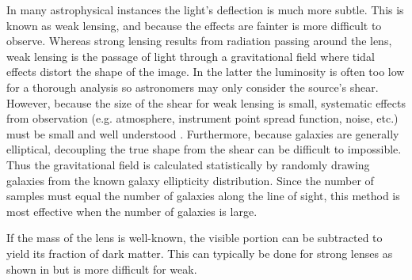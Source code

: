 In many astrophysical instances the light's deflection is much more subtle.  This is known as weak
lensing, and because the effects are fainter is more difficult to observe.  Whereas strong lensing results from radiation passing around
the lens, weak lensing is the passage of light through a gravitational field where tidal effects distort the shape of the image.  In the
latter the luminosity is often too low for a thorough analysis so
astronomers may only consider the source's shear.  However, because the size of the shear for weak lensing is small, systematic
effects from observation (e.g. atmosphere, instrument point spread function, noise, etc.) must be small and well
understood .  Furthermore,
because galaxies are generally elliptical, decoupling the true shape from the shear can be difficult to impossible.  Thus the
gravitational field is calculated statistically by randomly drawing galaxies from the known galaxy ellipticity distribution.  Since the
number of samples must equal the number of galaxies along the line of sight, this method is most effective when the number of galaxies is
large.

If the mass of the lens is well-known, the visible portion can be subtracted to yield its fraction of dark matter.  This can typically
be done for strong lenses as shown in  but is more difficult for weak.



